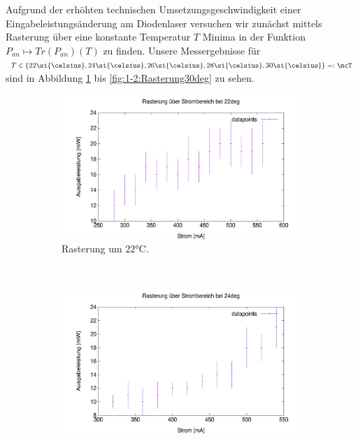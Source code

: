 \documentclass[../../main.tex]{subfiles}
\begin{document}
    Aufgrund der erhöhten technischen Umsetzungsgeschwindigkeit einer Eingabeleistungsänderung am Diodenlaser versuchen wir zunächst mittels Rasterung über eine konstante Temperatur $T$ Minima in der Funktion $P_{\textit{an}}\mapsto \textit{Tr}(P_{\textit{an}})(T)$ zu finden. Unsere Messergebnisse für $T\in\{22\si{\celsius}, 24\si{\celsius}, 26\si{\celsius}, 28\si{\celsius}, 30\si{\celsius}\}=:\mcT$ sind in Abbildung \ref{fig:1-2:Rasterung22deg} bis \ref{fig:1-2:Rasterung30deg} zu sehen. 
    \begin{figure}
        \centering
        \begin{subfigure}[t]{0.45\textwidth}
            \centering
            \includegraphics[width=\textwidth]{../../Bilddateien/1-2/Rasterung_22deg.png}
            \caption{Rasterung um $22\si{\celsius}$.}
            \label{fig:1-2:Rasterung22deg}
        \end{subfigure}
        \
        \begin{subfigure}[t]{0.45\textwidth}
            \centering
            \includegraphics[width=\textwidth]{../../Bilddateien/1-2/Rasterung_24deg.png}

\end{subfigure}
\end{figure}
\end{document}
